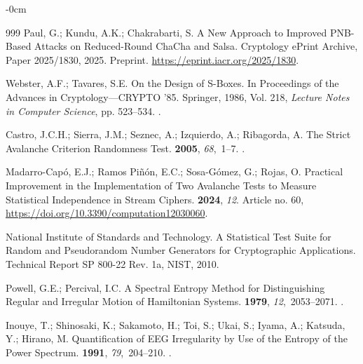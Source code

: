 \documentclass[electronics,article,submit,pdftex,oneauthor]{Definitions/mdpi}
\begin{document}
\begin{adjustwidth}{-\extralength}{0cm}
\begin{thebibliography}{999}
Paul, G.; Kundu, A.K.; Chakrabarti, S.
\newblock A New Approach to Improved {PNB}-Based Attacks on Reduced-Round
  {ChaCha} and {Salsa}.
\newblock Cryptology {ePrint} Archive, Paper 2025/1830,  2025.
\newblock Preprint. \url{https://eprint.iacr.org/2025/1830}.

Webster, A.F.; Tavares, S.E.
\newblock On the Design of {S}-Boxes.
\newblock In Proceedings of the Advances in Cryptology---{CRYPTO} '85.
  Springer,  1986, Vol. 218, {\em Lecture Notes in Computer Science}, pp.
  523--534.
.

Castro, J.C.H.; Sierra, J.M.; Seznec, A.; Izquierdo, A.; Ribagorda, A.
\newblock The Strict Avalanche Criterion Randomness Test.
 {\bf 2005}, {\em
  68},~1--7.
.

Madarro-Cap{\'o}, E.J.; {Ramos Pi{\~n}{\'o}n}, E.C.; Sosa-G{\'o}mez, G.; Rojas,
  O.
\newblock Practical Improvement in the Implementation of Two Avalanche Tests to
  Measure Statistical Independence in Stream Ciphers.
 {\bf 2024}, {\em 12}.
\newblock Article no. 60, {\url{https://doi.org/10.3390/computation12030060}}.

{National Institute of Standards and Technology}.
\newblock A Statistical Test Suite for Random and Pseudorandom Number
  Generators for Cryptographic Applications.
\newblock Technical Report SP 800-22 Rev. 1a, NIST,  2010.

Powell, G.E.; Percival, I.C.
\newblock A Spectral Entropy Method for Distinguishing Regular and Irregular
  Motion of Hamiltonian Systems.
 {\bf 1979}, {\em
  12},~2053--2071.
.

Inouye, T.; Shinosaki, K.; Sakamoto, H.; Toi, S.; Ukai, S.; Iyama, A.; Katsuda,
  Y.; Hirano, M.
\newblock Quantification of {EEG} Irregularity by Use of the Entropy of the
  Power Spectrum.
 {\bf 1991},
  {\em 79},~204--210.
.


\end{thebibliography}
\end{adjustwidth}
\end{document}
